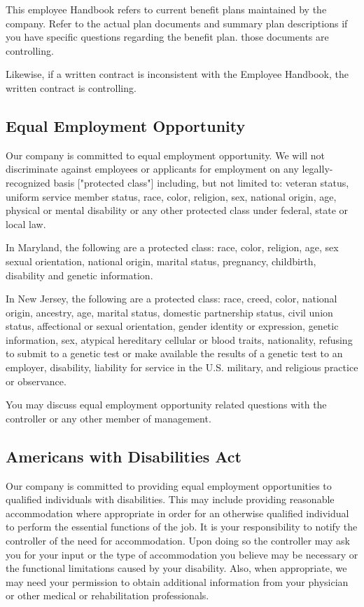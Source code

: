 This employee Handbook refers to current benefit plans maintained by the company. Refer to the actual plan documents and summary plan descriptions if you have specific questions regarding the benefit plan. those documents are controlling.

Likewise, if a written contract is inconsistent with the Employee Handbook, the written contract is controlling.

\subsection{Equal Employment Opportunity}

Our company is committed to equal employment opportunity. We will not discriminate against employees or applicants for employment on any legally-recognized basis ["protected class"] including, but not limited to: veteran status, uniform service member status, race, color, religion, sex, national origin, age, physical or mental disability or any other protected class under federal, state or local law.

In Maryland, the following are a protected class: race, color, religion, age, sex sexual orientation, national origin, marital status, pregnancy, childbirth, disability and genetic information.

In New Jersey, the following are a protected class: race, creed, color, national origin, ancestry, age, marital status, domestic partnership status, civil union status, affectional or sexual orientation, gender identity or expression, genetic information, sex, atypical hereditary cellular or blood traits, nationality, refusing to submit to a genetic test or make available the results of a genetic test to an employer, disability, liability for service in the U.S. military, and religious practice or observance.

You may discuss equal employment opportunity related questions with the controller or any other member of management.

\subsection{Americans with Disabilities Act}

Our company is committed to providing equal employment opportunities to qualified individuals with disabilities. This may include providing reasonable accommodation where appropriate in order for an otherwise qualified individual to perform the essential functions of the job. It is your responsibility to notify the controller of the need for accommodation. Upon doing so the controller may ask you for your input or the type of accommodation you believe may be necessary or the functional limitations caused by your disability. Also, when appropriate, we may need your permission to obtain additional information from your physician or other medical or rehabilitation professionals.

